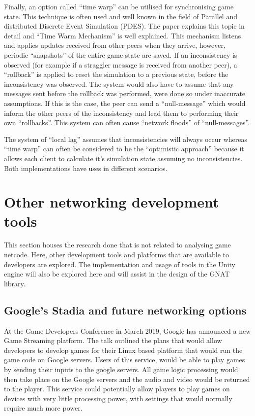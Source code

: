 Finally, an option called ``time warp'' can be utilised for synchronising game state. This technique is often used and well known in the field of Parallel and distributed Discrete Event Simulation (PDES). The paper  explains this topic in detail and ``Time Warm Mechanism'' is well explained. This mechanism listens and applies updates received from other peers when they arrive, however, periodic ``snapshots'' of the entire game state are saved. If an inconsistency is observed (for example if a straggler message is received from another peer), a ``rollback'' is applied to reset the simulation to a previous state, before the inconsistency was observed. The system would also have to assume that any messages sent before the rollback was performed, were done so under inaccurate assumptions. If this is the case, the peer can send a ``null-message'' which would inform the other peers of the inconsistency and lead them to performing their own ``rollbacks''. This system can often cause ``network floods'' of ``null-messages''.

The system of ``local lag'' assumes that inconsistencies will always occur whereas ``time warp'' can often be considered to be the ``optimistic approach'' because it allows each client to calculate it's simulation state assuming no inconsistencies. Both implementations have uses in different scenarios.

\section{Other networking development tools}
This section houses the research done that is not related to analysing game netcode. Here, other development tools and platforms that are available to developers are explored. The implementation and usage of tools in the Unity engine will also be explored here and will assist in the design of the GNAT library.

\subsection{Google's Stadia and future networking options}
At the Game Developers Conference in March 2019, Google has announced a new Game Streaming platform. The talk outlined the plans that would allow developers to develop games for their Linux based platform that would run the game code on Google servers. Users of this service, would be able to play games by sending their inputs to the google servers. All game logic processing would then take place on the Google servers and the audio and video would be returned to the player. This service could potentially allow players to play games on devices with very little processing power, with settings that would normally require much more power.

